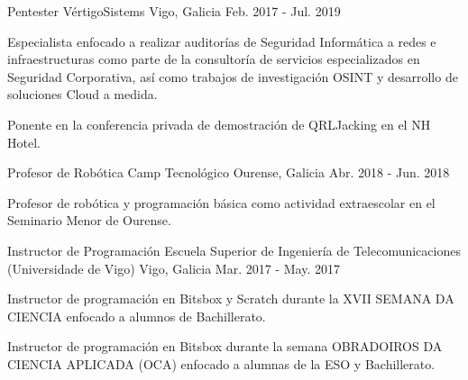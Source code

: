 \documentclass[11pt, a4paper]{style}
\begin{document}
\begin{cventries}
{\begin{cvitems}
      \end{cvitems}
    }
    \vspace{0.1cm}
  \cventry
    {Pentester} %
    {VértigoSistems} %
    {Vigo, Galicia} %
    {Feb. 2017 - Jul. 2019} %
    {
      \begin{cvitems} %
        \item {Especialista enfocado a realizar auditorías de Seguridad Informática a redes e infraestructuras como parte de la consultoría de servicios especializados en Seguridad Corporativa, así como trabajos de investigación OSINT y desarrollo de soluciones Cloud a medida.}
        \item {Ponente en la conferencia privada de demostración de QRLJacking en el NH Hotel.}
      \end{cvitems}
    }
    \vspace{0.1cm}
  \cventry
    {Profesor de Robótica} %
    {Camp Tecnológico} %
    {Ourense, Galicia} %
    {Abr. 2018 - Jun. 2018} %
    {
      \begin{cvitems} %
        \item {Profesor de robótica y programación básica como actividad extraescolar en el Seminario Menor de Ourense.}
      \end{cvitems}
    }
    \vspace{0.1cm}
  \cventry
    {Instructor de Programación} %
    {Escuela Superior de Ingeniería de Telecomunicaciones (Universidade de Vigo)} %
    {Vigo, Galicia} %
    {Mar. 2017 - May. 2017} %
    {
      \begin{cvitems} %
        \item {Instructor de programación en Bitsbox y Scratch durante la XVII SEMANA DA CIENCIA enfocado a alumnos de Bachillerato.}
        \item {Instructor de programación en Bitsbox durante la semana OBRADOIROS DA CIENCIA APLICADA (OCA) enfocado a alumnas de la ESO y Bachillerato.}
      \end{cvitems}
    }
\end{cventries}
\end{document}
